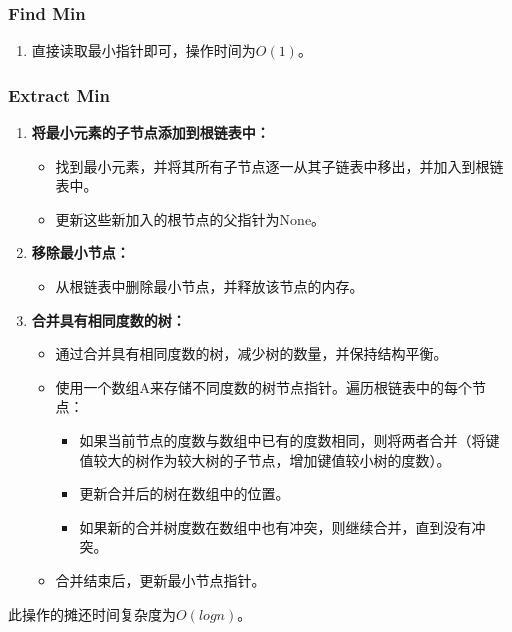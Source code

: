 \documentclass{article}
\begin{document}
\subsubsection{Find Min}
\begin{enumerate}
    \item 直接读取最小指针即可，操作时间为$O(1)$。
\end{enumerate}

\subsubsection{Extract Min}
\begin{enumerate}
    \item \textbf{将最小元素的子节点添加到根链表中：}
        \begin{itemize}
            \item 找到最小元素，并将其所有子节点逐一从其子链表中移出，并加入到根链表中。
            \item 更新这些新加入的根节点的父指针为None。
        \end{itemize}
    \item \textbf{移除最小节点：}
        \begin{itemize}
            \item 从根链表中删除最小节点，并释放该节点的内存。
        \end{itemize}
    \item \textbf{合并具有相同度数的树：}
        \begin{itemize}
            \item 通过合并具有相同度数的树，减少树的数量，并保持结构平衡。
            \item 使用一个数组A来存储不同度数的树节点指针。遍历根链表中的每个节点：
                \begin{itemize}
                    \item 如果当前节点的度数与数组中已有的度数相同，则将两者合并（将键值较大的树作为较大树的子节点，增加键值较小树的度数）。
                    \item 更新合并后的树在数组中的位置。
                    \item 如果新的合并树度数在数组中也有冲突，则继续合并，直到没有冲突。
                \end{itemize}
            \item 合并结束后，更新最小节点指针。
        \end{itemize}
\end{enumerate}
\par
此操作的摊还时间复杂度为$O(logn)$。
\end{document}
